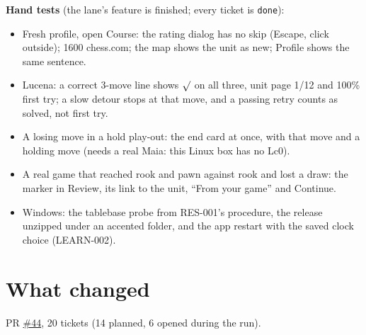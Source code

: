 \documentclass[11pt,a4paper]{article}
\begin{document}
\textbf{Hand tests} (the lane's feature is finished; every ticket is \texttt{done}):
\begin{itemize}
  \item[$\square$] Fresh profile, open Course: the rating dialog has no skip (Escape, click outside);
        1600 chess.com; the map shows the unit as new; Profile shows the same sentence.
  \item[$\square$] Lucena: a correct 3-move line shows $\surd$ on all three, unit page 1/12 and 100\% first try;
        a slow detour stops at that move, and a passing retry counts as solved, not first try.
  \item[$\square$] A losing move in a hold play-out: the end card at once, with that move and a holding move
        (needs a real Maia: this Linux box has no Lc0).
  \item[$\square$] A real game that reached rook and pawn against rook and lost a draw: the marker in Review, its
        link to the unit, ``From your game'' and Continue.
  \item[$\square$] Windows: the tablebase probe from RES-001's procedure, the release unzipped under an accented
        folder, and the app restart with the saved clock choice (LEARN-002).
\end{itemize}

\section*{What changed}

PR \href{https://github.com/Laginho/P-Chess/pull/44}{\#44}, 20 tickets (14 planned, 6 opened during the run).
\end{document}
